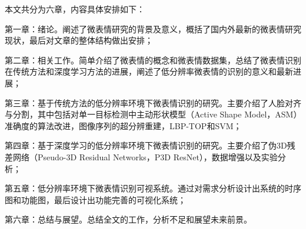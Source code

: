 本文共分为六章，内容具体安排如下：

第一章：绪论。阐述了微表情研究的背景及意义，概括了国内外最新的微表情研究现状，最后对文章的整体结构做出安排；

第二章：相关工作。简单介绍了微表情的概念和微表情数据集，总结了微表情识别在传统方法和深度学习方法的进展，阐述了低分辨率微表情的识别的意义和最新进展；

第三章：基于传统方法的低分辨率环境下微表情识别的研究。主要介绍了人脸对齐与分割，其中包括对单一目标检测中主动形状模型（Active Shape Model，ASM）准确度的算法改进，图像序列的超分辨重建，LBP-TOP和SVM；

第四章：基于深度学习的低分辨率环境下微表情识别的研究。主要介绍了伪3D残差网络（Pseudo-3D Residual Networks，P3D ResNet），数据增强以及实验分析；

第五章：低分辨率环境下微表情识别可视系统。通过对需求分析设计出系统的时序图和功能图，最后设计出功能完善的可视化系统；

第六章：总结与展望。总结全文的工作，分析不足和展望未来前景。
